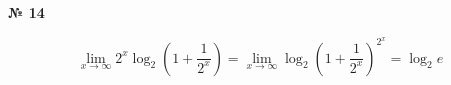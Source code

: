 \documentclass{article}
\begin{document}
\textbf{№ 14} 

\begingroup
\Large

$$ \lim\limits_{x \to \infty} 2^x \log_{2} \left( 1 + \frac{1}{2^x} \right)
= \lim\limits_{x \to \infty} \log_{2} \left( 1 + \frac{1}{2^x} \right)^{2^x}
= \log_{2} e $$

\endgroup
\end{document}
